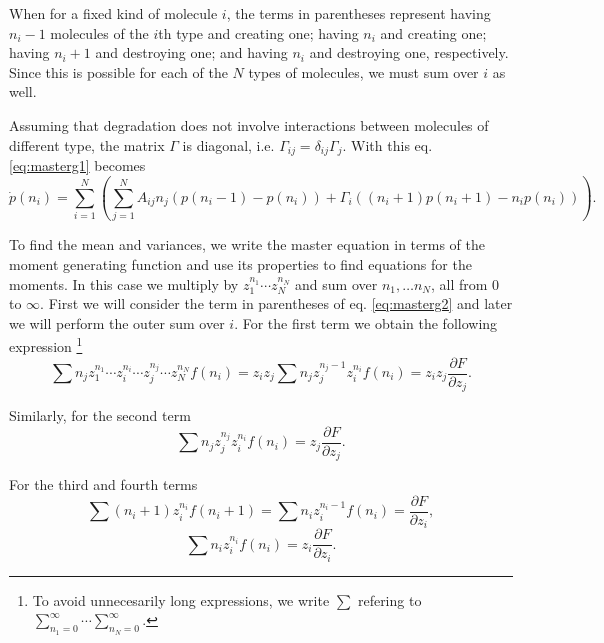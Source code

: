 When for a fixed kind of molecule $i$, the terms in parentheses represent having $n_i-1$ molecules of the $i$th type and creating one; having $n_i$ and creating one; having $n_i+1$ and destroying one; and having $n_i$ and destroying one, respectively. Since this is possible for each of the $N$ types of molecules, we must sum over $i$ as well.

Assuming that degradation does not involve interactions between molecules of different type, the matrix $\Gamma$ is diagonal, i.e. $\Gamma_{ij}=\delta_{ij}\Gamma_j$. With this eq. \eqref{eq:masterg1} becomes
\begin{equation}
\label{eq:masterg2}
\dot{p}(n_i) =  \sum_{i=1}^N\left(\sum_{j=1}^N A_{ij}n_j \left( p(n_i-1) - p(n_i) \right) + \Gamma_{i}((n_i+1)p(n_i+1)-n_ip(n_i))\right).
\end{equation}

To find the mean and variances, we write the master equation in terms of the moment generating function and use its properties to find equations for the moments. In this case we multiply by $z_1^{n_1}\dotsm z_N^{n_N}$ and sum over $n_1,\dotsc n_N$, all from $0$ to $\infty$. First we will consider the term in parentheses of eq. \eqref{eq:masterg2} and later we will perform the outer sum over $i$. For the first term we obtain the following expression \footnote{To avoid unnecesarily long expressions, we write $\sum$ refering to $\sum_{n_1=0}^\infty\dotsi\sum_{n_N=0}^\infty$.}
\begin{equation*}
  \sum n_j z_1^{n_1}\dotsm z_i^{n_i}\dotsm z_j^{n_j}\dotsm z_N^{n_N} f(n_i) = z_iz_j\sum n_jz_j^{n_j-1}z_i^{n_i}f(n_i) = z_iz_j\frac{\partial F}{\partial z_j}. 
\end{equation*}

Similarly, for the second term
\begin{equation*}
  \sum n_jz_j^{n_j}z_i^{n_i}f(n_i) = z_j\frac{\partial F}{\partial z_j}.
\end{equation*}

For the third and fourth terms
\begin{equation*}
  \sum (n_i+1)z_i^{n_i}f(n_i+1) = \sum n_i z_i^{n_i-1}f(n_i) = \frac{\partial F}{\partial z_i},
\end{equation*}
\begin{equation*}
  \sum n_iz_i^{n_i}f(n_i) = z_i\frac{\partial F}{\partial z_i}.
\end{equation*}

